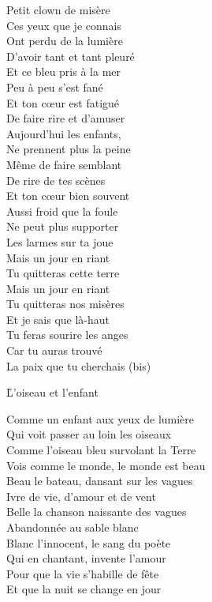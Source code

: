 \documentclass{novel}
\begin{document}
Petit clown de misère \\
Ces yeux que je connais \\
Ont perdu de la lumière \\
D’avoir tant et tant pleuré \\
Et ce bleu pris à la mer \\
Peu à peu s’est fané \\
Et ton cœur est fatigué \\
De faire rire et d’amuser \\

Aujourd’hui les enfants, \\
Ne prennent plus la peine \\
Même de faire semblant \\
De rire de tes scènes \\
Et ton cœur bien souvent \\
Aussi froid que la foule \\
Ne peut plus supporter \\
Les larmes sur ta joue \\

Mais un jour en riant \\
Tu quitteras cette terre \\
Mais un jour en riant \\
Tu quitteras nos misères \\
Et je sais que là-haut \\
Tu feras sourire les anges \\
Car tu auras trouvé \\
La paix que tu cherchais (bis)


\newpage
\normalsize

\h*{L’oiseau et l’enfant}

Comme un enfant aux yeux de lumière \\
Qui voit passer au loin les oiseaux \\
Comme l'oiseau bleu survolant la Terre \\
Vois comme le monde, le monde est beau \\

Beau le bateau, dansant sur les vagues \\
Ivre de vie, d'amour et de vent \\
Belle la chanson naissante des vagues \\
Abandonnée au sable blanc \\

Blanc l'innocent, le sang du poète \\
Qui en chantant, invente l'amour \\
Pour que la vie s'habille de fête \\
Et que la nuit se change en jour \\
\end{document}
